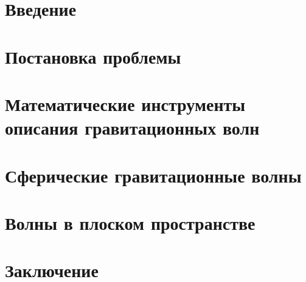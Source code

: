 \documentclass[12pt,a4paper,final]{article}
\def\docroot{../..}
\numberwithin{equation}{section}
\begin{document}
    \makedocroot

    
    \tableofcontents

    \newpage

    \section{Введение}
    

    \section{Постановка проблемы}
    

    \section{Математические инструменты описания гравитационных волн}
    

    \section{Сферические гравитационные волны}\label{sec:grav-spher}
    

    \section{Волны в плоском пространстве}
    
    

    \section{Заключение}
    

    \clearpage

    
    
\end{document}
